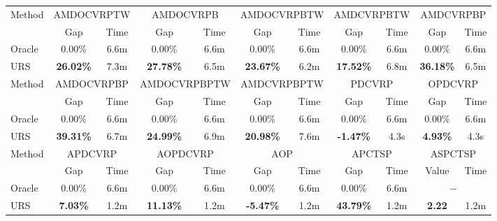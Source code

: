 \documentclass{article}
\theoremstyle{plain}
\theoremstyle{definition}
\theoremstyle{remark}
\begin{document}
\begin{table}[htbp]
{\begin{tabular}{l|cc|cc|cc|cc|cc}
    \midrule
    \midrule
    \multirow{2}[2]{*}{Method} & \multicolumn{2}{c|}{AMDOCVRPTW} & \multicolumn{2}{c|}{AMDOCVRPB} & \multicolumn{2}{c|}{AMDOCVRPBTW} & \multicolumn{2}{c|}{AMDCVRPBTW} & \multicolumn{2}{c}{AMDCVRPBP} \\
          & Gap   & Time  & Gap   & Time  & Gap   & Time  & Gap   & \multicolumn{1}{c|}{Time} & Gap   & \multicolumn{1}{c}{Time} \\
    \midrule
    Oracle & 0.00\% & 6.6m  & 0.00\% & 6.6m  & 0.00\% & 6.6m  & 0.00\% & \multicolumn{1}{c|}{6.6m} & 0.00\% & \multicolumn{1}{c}{6.6m} \\
    URS   & \cellcolor[HTML]{D0CECE}\textbf{26.02\%} & 7.3m  & \cellcolor[HTML]{D0CECE}\textbf{27.78\%} & 6.5m  & \cellcolor[HTML]{D0CECE}\textbf{23.67\%} & 6.2m  & \cellcolor[HTML]{D0CECE}\textbf{17.52\%} & \multicolumn{1}{c|}{6.8m} &  \cellcolor[HTML]{D0CECE}\textbf{36.18\%} & \multicolumn{1}{c}{6.5m} \\
    \midrule
    \midrule
    \multirow{2}[2]{*}{Method} & \multicolumn{2}{c|}{AMDOCVRPBP} & \multicolumn{2}{c|}{AMDOCVRPBPTW} & \multicolumn{2}{c|}{AMDCVRPBPTW} & \multicolumn{2}{c|}{PDCVRP} & \multicolumn{2}{c}{OPDCVRP} \\
          & Gap   & Time  & Gap   & Time  & Gap   & Time  & Gap   & \multicolumn{1}{c|}{Time} & Gap   & \multicolumn{1}{c}{Time} \\
    \midrule
    Oracle & 0.00\% & 6.6m  & 0.00\% & 6.6m  & 0.00\% & 6.6m  & 0.00\% & \multicolumn{1}{c|}{6.6m} & 0.00\% & \multicolumn{1}{c}{6.6m} \\
    URS   &  \cellcolor[HTML]{D0CECE}\textbf{39.31\%} & 6.7m  &  \cellcolor[HTML]{D0CECE}\textbf{24.99\%} & 6.9m  &  \cellcolor[HTML]{D0CECE}\textbf{20.98\%} & 7.6m  & \cellcolor[HTML]{D0CECE}\textbf{-1.47\%} & \multicolumn{1}{c|}{4.3s} & \cellcolor[HTML]{D0CECE}\textbf{4.93\%} & \multicolumn{1}{c}{4.3s} \\
    \midrule
    \midrule
    \multirow{2}[2]{*}{Method} 
& \multicolumn{2}{c|}{APDCVRP} 
& \multicolumn{2}{c|}{AOPDCVRP} 
& \multicolumn{2}{c|}{AOP} 
& \multicolumn{2}{c|}{APCTSP} 
& \multicolumn{2}{c}{ASPCTSP} \\
& Gap & Time & Gap & Time & Gap & Time & Gap & Time & Value & Time \\
\midrule
Oracle 
& 0.00\% & 6.6m 
& 0.00\% & 6.6m 
& 0.00\% & 6.6m 
& 0.00\% & 6.6m 
& \multicolumn{2}{c}{$-$} \\
URS   
& \cellcolor[HTML]{D0CECE}\textbf{7.03\%} & 1.2m  
& \cellcolor[HTML]{D0CECE}\textbf{11.13\%} & 1.2m  
& \cellcolor[HTML]{D0CECE}\textbf{-5.47\%} & 1.2m 
& \cellcolor[HTML]{D0CECE}\textbf{43.79\%} & 1.2m 
& \cellcolor[HTML]{D0CECE}\textbf{2.22} & 1.2m  \\
\bottomrule[0.5mm]
    \end{tabular}%
    }
   
  \label{tab:all_exp_unexplored_problems}%
\end{table}%
\end{document}
